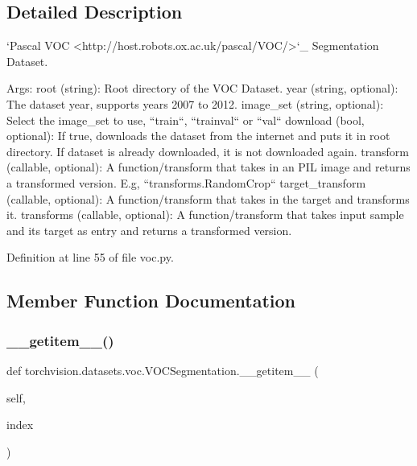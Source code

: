 \subsection{Detailed Description}
\begin{DoxyVerb}`Pascal VOC <http://host.robots.ox.ac.uk/pascal/VOC/>`_ Segmentation Dataset.

Args:
    root (string): Root directory of the VOC Dataset.
    year (string, optional): The dataset year, supports years 2007 to 2012.
    image_set (string, optional): Select the image_set to use, ``train``, ``trainval`` or ``val``
    download (bool, optional): If true, downloads the dataset from the internet and
        puts it in root directory. If dataset is already downloaded, it is not
        downloaded again.
    transform (callable, optional): A function/transform that  takes in an PIL image
        and returns a transformed version. E.g, ``transforms.RandomCrop``
    target_transform (callable, optional): A function/transform that takes in the
        target and transforms it.
    transforms (callable, optional): A function/transform that takes input sample and its target as entry
        and returns a transformed version.
\end{DoxyVerb}
 

Definition at line 55 of file voc.\+py.



\subsection{Member Function Documentation}
\mbox{\label{classtorchvision_1_1datasets_1_1voc_1_1VOCSegmentation_ac703a73e9ba2fbf134fedee541f80f1d}} 
\subsubsection{\texorpdfstring{\+\_\+\+\_\+getitem\+\_\+\+\_\+()}{\_\_getitem\_\_()}}
{\footnotesize\ttfamily def torchvision.\+datasets.\+voc.\+V\+O\+C\+Segmentation.\+\_\+\+\_\+getitem\+\_\+\+\_\+ (\begin{DoxyParamCaption}\item[{}]{self,  }\item[{}]{index }\end{DoxyParamCaption})}

